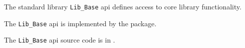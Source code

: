 
The standard library {\tt Lib\_Base} api defines access to core library functionality.

The {\tt Lib\_Base} api is implemented by the  package.

The {\tt Lib\_Base} api source code is in .

